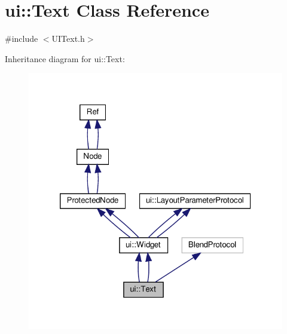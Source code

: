 \hypertarget{classui_1_1Text}{}\section{ui\+:\+:Text Class Reference}
\label{classui_1_1Text}


{\ttfamily \#include $<$U\+I\+Text.\+h$>$}



Inheritance diagram for ui\+:\+:Text\+:
\nopagebreak
\begin{figure}[H]
\begin{center}
\leavevmode
\includegraphics[width=320pt]{classui_1_1Text__inherit__graph}
\end{center}
\end{figure}


